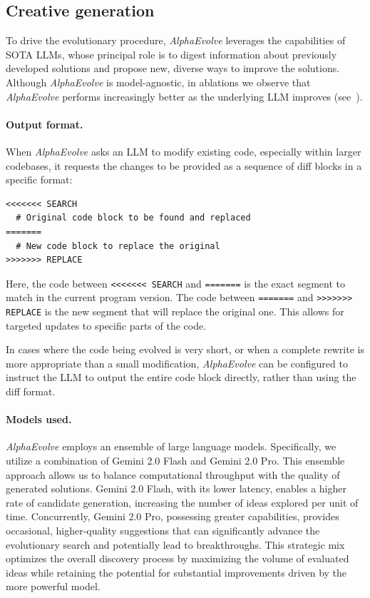 \documentclass[logo,copyright,12pt]{googledeepmind}
\theoremstyle{definition}
\theoremstyle{remark}
\theoremstyle{plain}
\newcommand{\method}{\emph{AlphaEvolve}\xspace}
\begin{document}
\subsection{Creative generation}
\label{subsec:generation}

To drive the evolutionary procedure, \method leverages the capabilities of SOTA LLMs, whose principal role is to digest information about previously developed solutions and propose new, diverse ways to improve the solutions.
Although \method is model-agnostic, in ablations we observe that \method performs increasingly better as the underlying LLM improves (see~).


\paragraph{Output format.}
When \method asks an LLM to modify existing code, especially within larger codebases, it requests the changes to be provided as a sequence of diff blocks in a specific format:

\begin{verbatim}
<<<<<<< SEARCH
  # Original code block to be found and replaced
=======
  # New code block to replace the original
>>>>>>> REPLACE
\end{verbatim}

Here, the code between \texttt{<{}<{}<{}<{}<{}<{}< SEARCH} and \texttt{=======} is the exact segment to match in the current program version. The code between \texttt{=======} and \texttt{>{}>{}>{}>{}>{}>{}> REPLACE} is the new segment that will replace the original one.
This allows for targeted updates to specific parts of the code.

In cases where the code being evolved is very short, or when a complete rewrite is more appropriate than a small modification, \method can be configured to instruct the LLM to output the entire code block directly, rather than using the diff format. 

\paragraph{Models used.}
\method employs an ensemble of large language models. Specifically, we utilize a combination of Gemini 2.0 Flash and Gemini 2.0 Pro.
This ensemble approach allows us to balance computational throughput with the quality of generated solutions.
Gemini 2.0 Flash, with its lower latency, enables a higher rate of candidate generation, increasing the number of ideas explored per unit of time.
Concurrently, Gemini 2.0 Pro, possessing greater capabilities, provides occasional, higher-quality suggestions that can significantly advance the evolutionary search and potentially lead to breakthroughs.
This strategic mix optimizes the overall discovery process by maximizing the volume of evaluated ideas while retaining the potential for substantial improvements driven by the more powerful model.
\end{document}
